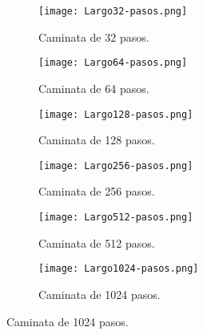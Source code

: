 \documentclass[12pt,letterpaper]{article}
\begin{document}
 \begin{figure}
 	\centering
 	\caption{Pasos de regreso al origen en escala logarítmica.} 
 	\begin{subfigure}[b]{0.45\linewidth}
 		\caption{Caminata de 32 pasos.}
 		\texttt{[image: Largo32-pasos.png]}
 		\label{32pasos}
 	\end{subfigure}
 	\begin{subfigure}[b]{0.45\linewidth}
 		\caption{Caminata de 64 pasos.}
 		\texttt{[image: Largo64-pasos.png]}
 		\label{64pasos}
 	\end{subfigure}
 	\begin{subfigure}[b]{0.45\linewidth}
 		\caption{Caminata de 128 pasos.}
 		\texttt{[image: Largo128-pasos.png]}
 		\label{128pasos}
 	\end{subfigure}
	\begin{subfigure}[b]{0.45\linewidth}
 		\caption{Caminata de 256 pasos.}
 		\texttt{[image: Largo256-pasos.png]}
 		\label{256pasos}
 	\end{subfigure}
 		\begin{subfigure}[b]{0.45\linewidth}
 		\caption{Caminata de 512 pasos.}
 		\texttt{[image: Largo512-pasos.png]}
 		\label{512pasos}
 	\end{subfigure}
 		\begin{subfigure}[b]{0.45\linewidth}
 		\caption{Caminata de 1024 pasos.}
 		\texttt{[image: Largo1024-pasos.png]}
 		\label{1024pasos}
 		\end{subfigure}
 		
\label{pasos-log}
 \end{figure}
 

  

\end{document}
